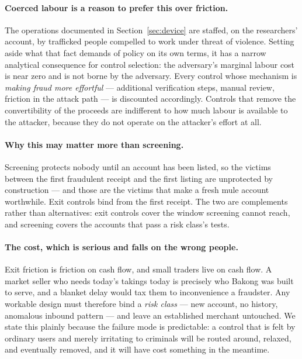 \documentclass[10pt,a4paper,twocolumn]{article}
\begin{document}
\paragraph{Coerced labour is a reason to prefer this over friction.}
The operations documented in Section~\ref{sec:device} are staffed, on the
researchers' account, by trafficked people compelled to work under threat of
violence. Setting aside what that fact demands of policy on its own terms, it
has a narrow analytical consequence for control selection: the adversary's
marginal labour cost is near zero and is not borne by the adversary. Every
control whose mechanism is \emph{making fraud more effortful} --- additional
verification steps, manual review, friction in the attack path --- is discounted
accordingly. Controls that remove the convertibility of the proceeds are
indifferent to how much labour is available to the attacker, because they do not
operate on the attacker's effort at all.

\paragraph{Why this may matter more than screening.}
Screening protects nobody until an account has been listed, so the victims
between the first fraudulent receipt and the first listing are unprotected by
construction --- and those are the victims that make a fresh mule account
worthwhile. Exit controls bind from the first receipt. The two are complements
rather than alternatives: exit controls cover the window screening cannot reach,
and screening covers the accounts that pass a risk class's tests.

\paragraph{The cost, which is serious and falls on the wrong people.}
Exit friction is friction on cash flow, and small traders live on cash flow. A
market seller who needs today's takings today is precisely who Bakong was built
to serve, and a blanket delay would tax them to inconvenience a fraudster. Any
workable design must therefore bind a \emph{risk class} --- new account, no
history, anomalous inbound pattern --- and leave an established merchant
untouched. We state this plainly because the failure mode is predictable: a
control that is felt by ordinary users and merely irritating to criminals will
be routed around, relaxed, and eventually removed, and it will have cost
something in the meantime.
\end{document}
